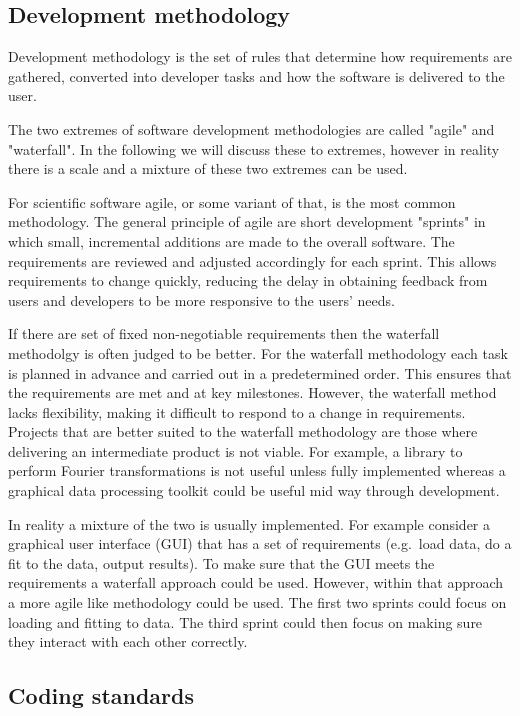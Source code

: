 \documentclass[jnr]{iosart2x}
\begin{document}
\subsection{Development methodology}
\label{Development methodology}

Development methodology is the set of rules that determine how requirements are gathered, converted into developer tasks and how the software is delivered to the user.

The two extremes of software development methodologies are called "agile" and "waterfall".
In the following we will discuss these to extremes, however in reality there is a scale and a mixture of these two extremes can be used.

For scientific software agile, or some variant of that, is the most common methodology.
The general principle of agile are short development "sprints" in which small, incremental additions are made to the overall software.
The requirements are reviewed and adjusted accordingly for each sprint.
This allows requirements to change quickly, reducing the delay in obtaining feedback from users and developers to be more responsive to the users' needs.

If there are set of fixed non-negotiable requirements then the waterfall methodolgy is often judged to be better.
For the waterfall methodology each task is planned in advance and carried out in a predetermined order.
This ensures that the requirements are met and at key milestones.
However, the waterfall method lacks flexibility, making it difficult to respond to a change in requirements.
Projects that are better suited to the waterfall methodology are those where delivering an intermediate product is not viable.
For example, a library to perform Fourier transformations is not useful unless fully implemented whereas a graphical data processing toolkit could be useful mid way through development.

In reality a mixture of the two is usually implemented.
For example consider a graphical user interface (GUI) that has a set of requirements (e.g.\ load data, do a fit to the data, output results).
To make sure that the GUI meets the requirements a waterfall approach could be used.
However, within that approach a more agile like methodology could be used.
The first two sprints could focus on loading and fitting to data.
The third sprint could then focus on making sure they interact with each other correctly.

\subsection{Coding standards}
\label{Coding standards}
\end{document}
